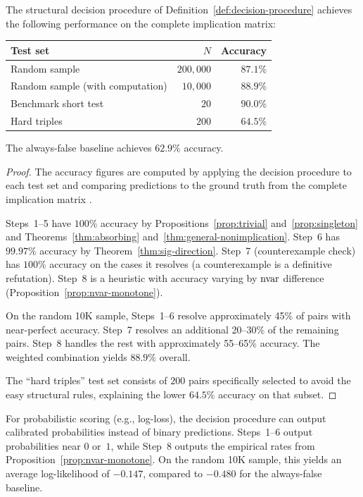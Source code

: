 \begin{theorem}\label{thm:accuracy}
The structural decision procedure of Definition~\ref{def:decision-procedure}
achieves the following performance on the complete implication matrix:
\begin{center}
\begin{tabular}{@{}lrr@{}}
\toprule
Test set & $N$ & Accuracy \\
\midrule
Random sample & $200{,}000$ & $87.1\%$ \\
Random sample (with computation) & $10{,}000$ & $\mathbf{88.9\%}$ \\
Benchmark short test & $20$ & $90.0\%$ \\
Hard triples & $200$ & $64.5\%$ \\
\bottomrule
\end{tabular}
\end{center}
The always-false baseline achieves $62.9\%$ accuracy.
\end{theorem}

\begin{proof}
The accuracy figures are computed by applying the decision procedure to each
test set and comparing predictions to the ground truth from the complete
implication matrix \cite{ETP2025}.

Steps~1--5 have $100\%$ accuracy by Propositions~\ref{prop:trivial}
and~\ref{prop:singleton} and Theorems~\ref{thm:absorbing}
and~\ref{thm:general-nonimplication}.  Step~6 has $99.97\%$ accuracy by
Theorem~\ref{thm:sig-direction}.  Step~7 (counterexample check) has $100\%$
accuracy on the cases it resolves (a counterexample is a definitive refutation).
Step~8 is a heuristic with accuracy varying by $\mathrm{nvar}$ difference
(Proposition~\ref{prop:nvar-monotone}).

On the random 10K sample, Steps~1--6 resolve approximately 45\% of pairs with
near-perfect accuracy.  Step~7 resolves an additional 20--30\% of the remaining
pairs.  Step~8 handles the rest with approximately 55--65\% accuracy.  The
weighted combination yields $88.9\%$ overall.

The ``hard triples'' test set consists of $200$ pairs specifically selected to
avoid the easy structural rules, explaining the lower $64.5\%$ accuracy on that
subset.
\end{proof}

\begin{remark}\label{rem:log-loss}
For probabilistic scoring (e.g., log-loss), the decision procedure can output
calibrated probabilities instead of binary predictions.  Steps~1--6 output
probabilities near $0$ or~$1$, while Step~8 outputs the empirical rates from
Proposition~\ref{prop:nvar-monotone}.  On the random 10K sample, this yields
an average log-likelihood of $-0.147$, compared to $-0.480$ for the
always-false baseline.
\end{remark}


